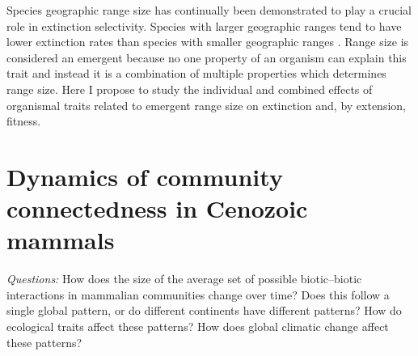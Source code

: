\documentclass[12pt,letterpaper]{article}
\begin{document}


Species geographic range size has continually been demonstrated to play a crucial role in extinction selectivity. Species with larger geographic ranges tend to have lower extinction rates than species with smaller geographic ranges \citep{Jablonski1986,Harnik2013,Nurnberg2013a,Jablonski2003,Roy2009c}. Range size is considered an emergent because no one property of an organism can explain this trait and instead it is a combination of multiple properties which determines range size. Here I propose to study the individual and combined effects of organismal traits related to emergent range size on extinction and, by extension, fitness.


\section{Dynamics of community connectedness in Cenozoic mammals}

\textit{Questions:} 
How does the size of the average set of possible biotic--biotic interactions in mammalian communities change over time? Does this follow a single global pattern, or do different continents have different patterns? How do ecological traits affect these patterns? How does global climatic change affect these patterns?
\end{document}
